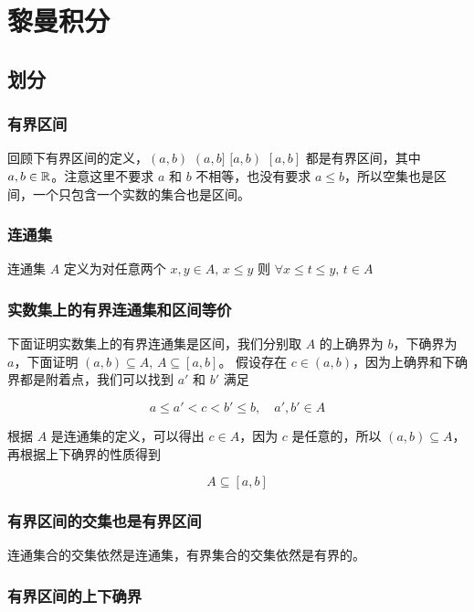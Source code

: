 \chapter{黎曼积分}

\section{划分}

\subsection{有界区间}

回顾下有界区间的定义，$(a,b) \,\, (a,b] \,\, [a,b) \,\, [a,b]$ 都是有界区间，其中 $a, b \in \mathbb{R}$。注意这里不要求 $a$ 和 $b$ 不相等，也没有要求 $a \le b$，所以空集也是区间，一个只包含一个实数的集合也是区间。

\subsection{连通集}

连通集 $A$ 定义为对任意两个 $x, y \in A,\, x \le y$ 则 $\forall x \le t \le y, \, t \in A$ 

\subsection{实数集上的有界连通集和区间等价}

下面证明实数集上的有界连通集是区间，我们分别取 $A$ 的上确界为 $b$，下确界为 $a$，下面证明 $(a,b) \subseteq A,\, A \subseteq [a,b]$。
假设存在 $c \in (a,b)$，因为上确界和下确界都是附着点，我们可以找到 $a'$ 和 $b'$ 满足

\[
a \le a' < c < b' \le b,\quad a', b' \in A
\]

根据 $A$ 是连通集的定义，可以得出 $c \in A$，因为 $c$ 是任意的，所以 $(a,b) \subseteq A$，再根据上下确界的性质得到

\[
A \subseteq [a,b]
\]


\subsection{有界区间的交集也是有界区间}

连通集合的交集依然是连通集，有界集合的交集依然是有界的。

\subsection{有界区间的上下确界}

